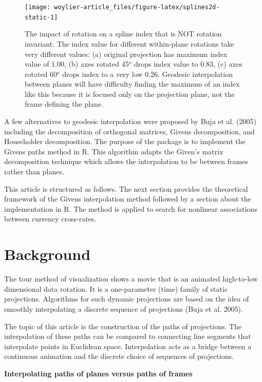 \begin{figure}
\texttt{[image: woylier-article\_files/figure-latex/splines2d-static-1]} \caption{The impact of rotation on a spline index that is NOT rotation invariant. The index value for different within-plane rotations take very different values: (a) original projection has maximum index value of 1.00, (b) axes rotated 45$^o$ drops index value to 0.83, (c) axes rotated 60$^o$ drops index to a very low 0.26. Geodesic interpolation between planes will have difficulty finding the maximum of an index like this because it is focused only on the projection plane, not the frame defining the plane.}\label{fig:splines2d-static}
\end{figure}

A few alternatives to geodesic interpolation were proposed by Buja et al. (2005) including the decomposition of orthogonal matrices, Givens decomposition, and Householder decomposition. The purpose of the  package is to implement the Givens paths method in R. This algorithm adapts the Given's matrix decomposition technique which allows the interpolation to be between frames rather than planes.

This article is structured as follows. The next section provides the theoretical framework of the Givens interpolation method followed by a section about the implementation in R. The method is applied to search for nonlinear associations between currency cross-rates.

\hypertarget{background}{%
\section{Background}\label{background}}

The tour method of visualization shows a movie that is an animated high-to-low dimensional data rotation. It is a one-parameter (time) family of static projections. Algorithms for such dynamic projections are based on the idea of smoothly interpolating a discrete sequence of projections (Buja et al. 2005).

The topic of this article is the construction of the paths of projections. The interpolation of these paths can be compared to connecting line segments that interpolate points in Euclidean space. Interpolation acts as a bridge between a continuous animation and the discrete choice of sequences of projections.

\textbf{Interpolating paths of planes versus paths of frames}

